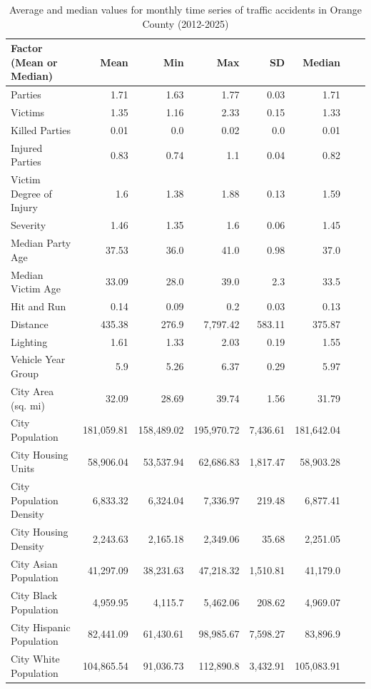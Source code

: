 \begin{table}[h!]
\caption{Average and median values for monthly time series of traffic accidents in Orange County (2012-2025)}
\label{tbl4}
\begin{tabular}{lrrrrrrr}
\toprule
Factor (Mean or Median) & Mean\footnotemark[1] & Min\footnotemark[1] & Max\footnotemark[1] & SD\footnotemark[1] & Median\footnotemark[1] \\
\midrule
Parties & 1.71 & 1.63 & 1.77 & 0.03 & 1.71 \\
Victims & 1.35 & 1.16 & 2.33 & 0.15 & 1.33 \\
Killed Parties & 0.01 & 0.0 & 0.02 & 0.0 & 0.01 \\
Injured Parties & 0.83 & 0.74 & 1.1 & 0.04 & 0.82 \\
Victim Degree of Injury & 1.6 & 1.38 & 1.88 & 0.13 & 1.59 \\
\midrule
Severity\footnotemark[2] & 1.46 & 1.35 & 1.6 & 0.06 & 1.45 \\
Median Party Age & 37.53 & 36.0 & 41.0 & 0.98 & 37.0 \\
Median Victim Age & 33.09 & 28.0 & 39.0 & 2.3 & 33.5 \\
Hit and Run\footnotemark[3] & 0.14 & 0.09 & 0.2 & 0.03 & 0.13 \\
Distance & 435.38 & 276.9 & 7,797.42 & 583.11 & 375.87 \\
Lighting\footnotemark[4] & 1.61 & 1.33 & 2.03 & 0.19 & 1.55 \\
Vehicle Year Group & 5.9 & 5.26 & 6.37 & 0.29 & 5.97 \\
\midrule
City Area (sq. mi) & 32.09 & 28.69 & 39.74 & 1.56 & 31.79 \\
City Population & 181,059.81 & 158,489.02 & 195,970.72 & 7,436.61 & 181,642.04 \\
City Housing Units & 58,906.04 & 53,537.94 & 62,686.83 & 1,817.47 & 58,903.28 \\
City Population Density & 6,833.32 & 6,324.04 & 7,336.97 & 219.48 & 6,877.41 \\
City Housing Density & 2,243.63 & 2,165.18 & 2,349.06 & 35.68 & 2,251.05 \\
City Asian Population & 41,297.09 & 38,231.63 & 47,218.32 & 1,510.81 & 41,179.0 \\
City Black Population & 4,959.95 & 4,115.7 & 5,462.06 & 208.62 & 4,969.07 \\
City Hispanic Population & 82,441.09 & 61,430.61 & 98,985.67 & 7,598.27 & 83,896.9 \\
City White Population & 104,865.54 & 91,036.73 & 112,890.8 & 3,432.91 & 105,083.91 \\

\end{tabular}
\end{table}
